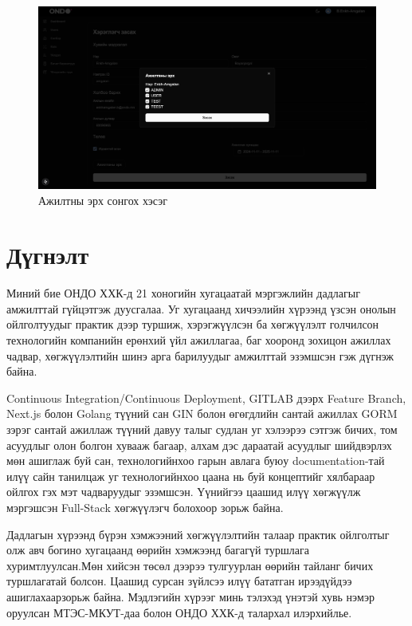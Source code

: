 \begin{figure}
	\centering
	\includegraphics[width=15cm]{images/role.png}
	\caption{Ажилтны эрх сонгох хэсэг}
\end{figure}
\pagebreak

\clearpage

\section{Дүгнэлт}
Миний бие ОНДО ХХК-д 21 хоногийн хугацаатай мэргэжлийн дадлагыг амжилттай гүйцэтгэж дуусгалаа. Уг хугацаанд хичээлийн хүрээнд үзсэн онолын ойлголтуудыг практик дээр туршиж, хэрэгжүүлсэн ба хөгжүүлэлт голчилсон технологийн компанийн ерөнхий үйл ажиллагаа, баг хооронд зохицон ажиллах чадвар, хөгжүүлэлтийн шинэ арга барилуудыг амжилттай эзэмшсэн гэж дүгнэж байна.

\quad Continuous Integration/Continuous Deployment, GITLAB дээрх Feature Branch, Next.js болон Golang түүний сан GIN болон өгөгдлийн сантай ажиллах GORM зэрэг сантай ажиллаж түүний давуу талыг судлан уг хэлээрээ сэтгэж бичих, том асуудлыг олон болгон хувааж багаар, алхам дэс дараатай асуудлыг шийдвэрлэх мөн ашиглаж буй сан, технологийнхоо гарын авлага буюу documentation-тай илүү сайн танилцаж уг технологийнхоо цаана нь буй концептийг хялбараар ойлгох гэх мэт чадваруудыг эзэмшсэн. Үүнийгээ цаашид илүү хөгжүүлж мэргэшсэн Full-Stack хөгжүүлэгч болохоор зорьж байна. 

\quad Дадлагын хүрээнд бүрэн хэмжээний хөгжүүлэлтийн талаар практик ойлголтыг олж авч богино хугацаанд өөрийн хэмжээнд багагүй туршлага хуримтлуулсан.Мөн хийсэн төсөл дээрээ тулгуурлан өөрийн
тайланг бичих туршлагатай болсон. Цаашид сурсан зүйлсээ илүү бататган ирээдүйдээ ашиглахаарзорьж байна. Мэдлэгийн хүрээг минь тэлэхэд үнэтэй хувь нэмэр оруулсан МТЭС-МКУТ-даа болон ОНДО ХХК-д талархал илэрхийлье.